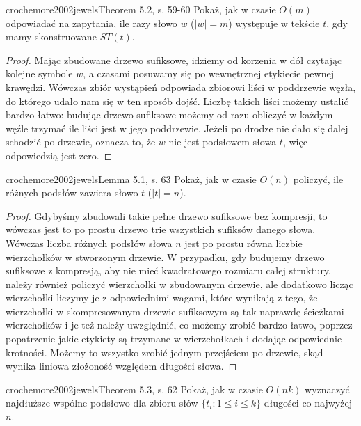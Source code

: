 \begin{problem}{crochemore2002jewels}{Theorem 5.2, s. 59-60}
  Pokaż, jak w czasie $O(m)$ odpowiadać na zapytania, ile razy słowo $w$ ($|w| = m$) występuje w tekście $t$, gdy mamy skonstruowane $ST(t)$.
\end{problem}

\begin{proof}
Mając zbudowane drzewo sufiksowe, idziemy od korzenia w dół czytając kolejne symbole $w$, a czasami posuwamy się po wewnętrznej etykiecie pewnej krawędzi. Wówczas zbiór wystąpień odpowiada zbiorowi liści w poddrzewie węzła, do którego udało nam się w ten sposób dojść. Liczbę takich liści możemy ustalić bardzo łatwo: budując drzewo sufiksowe możemy od razu obliczyć w każdym węźle trzymać ile liści jest w jego poddrzewie. Jeżeli po drodze nie dało się dalej schodzić po drzewie, oznacza to, że $w$ nie jest podsłowem słowa $t$, więc odpowiedzią jest zero.
\end{proof}

\begin{problem}{crochemore2002jewels}{Lemma 5.1, s. 63}
  Pokaż, jak w czasie $O(n)$ policzyć, ile różnych podsłów zawiera słowo $t$ ($|t| = n$).
\end{problem}

\begin{proof}
Gdybyśmy zbudowali takie pełne drzewo sufiksowe bez kompresji, to wówczas jest to po prostu drzewo trie wszystkich sufiksów danego słowa. Wówczas liczba różnych podsłów słowa $n$ jest po prostu równa liczbie wierzchołków w stworzonym drzewie. W przypadku, gdy budujemy drzewo sufiksowe z kompresją, aby nie mieć kwadratowego rozmiaru całej struktury, należy również policzyć wierzchołki w zbudowanym drzewie, ale dodatkowo licząc wierzchołki liczymy je z odpowiednimi wagami, które wynikają z tego, że wierzchołki w skompresowanym drzewie sufiksowym są tak naprawdę ścieżkami wierzchołków i je też należy uwzględnić, co możemy zrobić bardzo łatwo, poprzez popatrzenie jakie etykiety są trzymane w wierzchołkach i dodając odpowiednie krotności. Możemy to wszystko zrobić jednym przejściem po drzewie, skąd wynika liniowa złożoność względem długości słowa.
\end{proof}

\begin{problem}{crochemore2002jewels}{Theorem 5.3, s. 62}
  Pokaż, jak w czasie $O(n k)$ wyznaczyć najdłuższe wspólne podsłowo dla zbioru słów $\{t_i: 1 \le i \le k\}$ długości co najwyżej $n$.
\end{problem}

